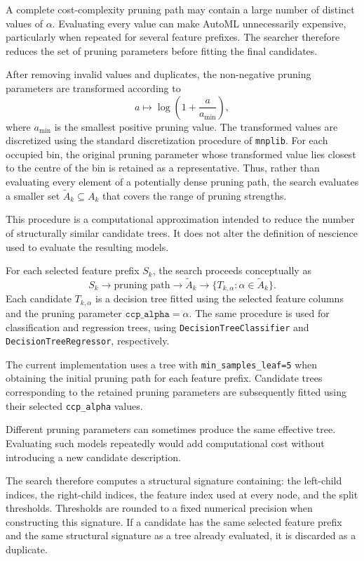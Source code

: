 A complete cost-complexity pruning path may contain a large number of distinct values of $\alpha$. Evaluating every value can make AutoML unnecessarily expensive, particularly when repeated for several feature prefixes. The searcher therefore reduces the set of pruning parameters before fitting the final candidates.

After removing invalid values and duplicates, the non-negative pruning parameters are transformed according to
\[
a \longmapsto \log\left(1+\frac{a}{a_{\min}}\right),
\]
where $a_{\min}$ is the smallest positive pruning value. The transformed values are discretized using the standard discretization procedure of \texttt{mnplib}. For each occupied bin, the original pruning parameter whose transformed value lies closest to the centre of the bin is retained as a representative. Thus, rather than evaluating every element of a potentially dense pruning path, the search evaluates a smaller set $\widetilde{A}_k \subseteq A_k$  that covers the range of pruning strengths.

This procedure is a computational approximation intended to reduce the number of structurally similar candidate trees. It does not alter the definition of nescience used to evaluate the resulting models.

For each selected feature prefix $S_k$, the search proceeds conceptually as
\[
S_k \longrightarrow \text{pruning path} \longrightarrow \widetilde{A}_k
\longrightarrow \{T_{k,\alpha}:\alpha\in\widetilde{A}_k\}.
\]
Each candidate $T_{k,\alpha}$  is a decision tree fitted using the selected feature columns and the pruning parameter $\texttt{ccp\_alpha}=\alpha$. The same procedure is used for classification and regression trees, using \texttt{DecisionTreeClassifier} and \texttt{DecisionTreeRegressor}, respectively.

The current implementation uses a tree with \texttt{min\_samples\_leaf=5} when obtaining the initial pruning path for each feature prefix. Candidate trees corresponding to the retained pruning parameters are subsequently fitted using their selected \texttt{ccp\_alpha} values.

Different pruning parameters can sometimes produce the same effective tree. Evaluating such models repeatedly would add computational cost without introducing a new candidate description.

The search therefore computes a structural signature containing: the left-child indices, the right-child indices, the feature index used at every node, and the split thresholds. Thresholds are rounded to a fixed numerical precision when constructing this signature. If a candidate has the same selected feature prefix and the same structural signature as a tree already evaluated, it is discarded as a duplicate.

